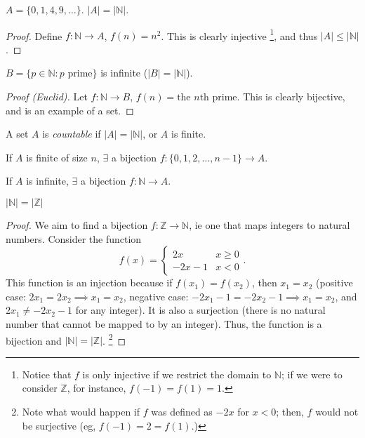 \documentclass[12pt,oneside]{article}
\begin{document}
\begin{proposition}
  $A = \{0, 1, 4, 9, \dots\}$. $|A| = |\mathbb{N}|$.
\end{proposition}

\begin{proof}[Proof]
  Define $f: \mathbb{N} \to A$, $f(n) = n^2$. This is clearly injective \footnote{Notice that $f$ is only injective if we restrict the domain to $\mathbb{N}$; if we were to consider $\mathbb{Z}$, for instance, $f(-1) = f(1) = 1$.}, and thus $|A| \leq |\mathbb{N}|$.
\end{proof}

\begin{proposition}
  $B = \{p \in \mathbb{N} : p \text{ prime}\}$ is infinite ($|B|=|\mathbb{N}|$).
\end{proposition}
\begin{proof}[Proof (Euclid)]
  Let $f: \mathbb{N} \to B$, $f(n) = \text{the } n\text{th prime}$. This is clearly bijective, and is an example of  a set. 
\end{proof}

\begin{definition}
  A set $A$ is \emph{countable} if $|A| = |\mathbb{N}|$, or $A$ is finite. 
  
  If $A$ is finite of size $n$, $\exists$ a bijection $f: \{0,1,2,\dots,n-1\} \to A$. 
  
  If $A$ is infinite, $\exists$ a bijection $f: \mathbb{N} \to A$.
\end{definition}

\begin{proposition}
  $|\mathbb{N}|=|\mathbb{Z}|$
\end{proposition}

\begin{proof}[Proof]
  We aim to find a bijection $f: \mathbb{Z} \to \mathbb{N}$, ie one that maps integers to natural numbers. Consider the function \[f(x) = \begin{cases}
    2x & x \geq 0\\
    -2x-1 & x < 0
  \end{cases}.\]
  This function is an injection because if $f(x_1)=f(x_2)$, then $x_1 = x_2$ (positive case: $2x_1 = 2x_2 \implies x_1 = x_2$, negative case: $-2x_1-1 = -2x_2-1 \implies x_1 = x_2$, and $2x_1 \neq -2x_2 - 1$ for any integer). It is also a surjection (there is no natural number that cannot be mapped to by an integer). Thus, the function is a bijection and $|\mathbb{N}|=|\mathbb{Z}|$. \footnote{Note what would happen if $f$ was defined as $-2x$ for $x<0$; then, $f$ would not be surjective (eg, $f(-1) = 2 = f(1)$.)}
\end{proof}
\end{document}
